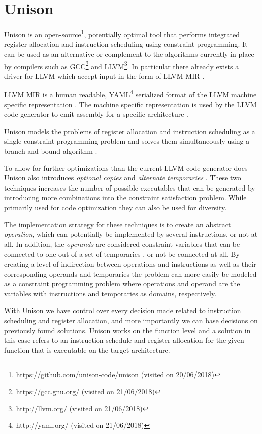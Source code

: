 \section{Unison}
\label{sec:unison}

Unison is an open-source\footnote{\url{https://github.com/unison-code/unison} (visited on 20/06/2018)},
potentially optimal tool that performs integrated register allocation and instruction
scheduling using constraint programming. It can be used as an alternative or complement to
the algorithms currently in place by compilers such as GCC\footnote{https://gcc.gnu.org/ (visited on 21/06/2018)}
and LLVM\footnote{http://llvm.org/ (visited on 21/06/2018)}. In particular there
already exists a driver for LLVM which accept input in the form of LLVM MIR \cite{unison-docs}.

LLVM MIR is a human readable, YAML\footnote{http://yaml.org/ (visited on 21/06/2018)}
serialized format of the LLVM machine specific representation \cite{llvm-mir-lang-ref}.
The machine specific representation is used by the LLVM code generator to emit assembly
for a specific architecture \cite{welcome-to-backend}.

Unison models the problems of register allocation and instruction scheduling as a single
constraint programming problem and solves them simultaneously using a branch and bound
algorithm \cite{unison-docs,reg-alloc-inst-sched-uni,unison-src}.

To allow for further optimizations than the current LLVM code generator does Unison also
introduces \textit{optional copies} and \textit{alternate temporaries}
\cite{reg-alloc-inst-sched-uni}. These two techniques increases the number of possible
executables that can be generated by introducing more combinations into the constraint
satisfaction problem. While primarily used for code optimization they can also be used for
diversity.

The implementation strategy for these techniques is to create an abstract \textit{operation},
which can potentially be implemented by several instructions, or not at all. In addition,
the \textit{operands} are considered constraint variables that can be connected to one out
of a set of temporaries \cite{unison-docs}, or not be connected at all. By creating a
level of indirection between operations and instructions as well as their corresponding
operands and temporaries the problem can more easily be modeled as a constraint
programming problem where operations and operand are the variables with instructions and
temporaries as domains, respectively.

With Unison we have control over every decision made related to instruction scheduling and
register allocation, and more importantly we can base decisions on previously found solutions.
Unison works on the function level and a solution in this case refers to an instruction
schedule and register allocation for the given function that is executable on the target
architecture.
